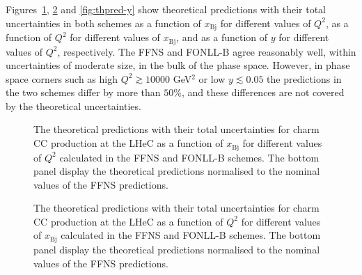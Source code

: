 \documentclass[pdftex,twocolumn,epjc3]{svjour3}          %
\newcommand{\xbj}{\ensuremath{x_{\text{Bj}}}\xspace}
\newcommand{\fonll} {{FONLL-B}\xspace}
\newcommand{\ffns} {{FFNS}\xspace}
\begin{document}
Figures~\ref{fig:thpred-x}, \ref{fig:thpred-q2} and \ref{fig:thpred-y} show theoretical predictions with their total uncertainties in both schemes as a function of \xbj for different values of $Q^2$, as a function of $Q^2$ for different values of \xbj, and as a function of $y$ for different values of $Q^2$, respectively. The \ffns and \fonll agree reasonably well, within uncertainties of moderate size, in the bulk of the phase space. However, in phase space corners such as high $Q^2 \gtrsim 10000$ GeV$^2$ or low $y \lesssim 0.05$ the predictions in the two schemes differ by more than $50\%$, and these differences are not covered by the theoretical uncertainties.

\begin{figure}
    \centering
    \caption{The theoretical predictions with their total uncertainties for charm CC production at the LHeC as a function of \xbj for different values of $Q^2$ calculated in the \ffns and \fonll schemes. The bottom panel display the theoretical predictions normalised to the nominal values of the \ffns predictions.}
    \label{fig:thpred-x}
\end{figure}

\begin{figure}
    \centering
    \caption{The theoretical predictions with their total uncertainties for charm CC production at the LHeC as a function of $Q^2$ for different values of \xbj calculated in the \ffns and \fonll schemes. The bottom panel display the theoretical predictions normalised to the nominal values of the \ffns predictions.}
    \label{fig:thpred-q2}
\end{figure}
\end{document}

